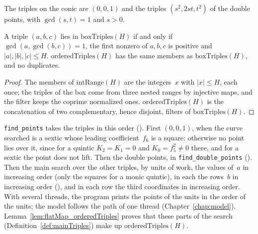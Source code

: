 The triples on the conic are $(0, 0, 1)$ and the triples $(s^2, 2st, t^2)$ of the double points,
with $\gcd(s, t) = 1$ and $s > 0$.

\begin{lemma}\label{lem:mem_orderedTriples_iff}
  \leanok
  A triple $(a, b, c)$ lies in $\mathrm{boxTriples}(H)$ if and only if $\gcd(a, \gcd(b, c)) = 1$, the first
  nonzero of $a, b, c$ is positive and $|a|, |b|, |c| \le H$. $\mathrm{orderedTriples}(H)$ has the
  same members as $\mathrm{boxTriples}(H)$, and no duplicates.
\end{lemma}

\begin{proof}\leanok
  The members of $\mathrm{intRange}(H)$ are the integers~$x$ with $|x| \le H$, each once; the
  triples of the box come from three nested ranges by injective maps, and the filter keeps the
  coprime normalized ones. $\mathrm{orderedTriples}(H)$ is the concatenation of two complementary,
  hence disjoint, filters of $\mathrm{boxTriples}(H)$.
\end{proof}

\begin{remark}\label{rem:specTriplesC}
  \texttt{find\_points} takes the triples in this order (). First
  $(0, 0, 1)$, when the curve searched is a sextic whose leading coefficient~$f_6$ is a square:
  otherwise no point lies over it, since for a quintic $K_2 = K_1 = 0$ and $K_0 = f_5^2 \ne 0$
  there, and for a sextic the point does not lift. Then the double points, in
  \texttt{find\_double\_points} (). Then the main search over the
  other triples, by units of work, the values of~$a$ in increasing order (only the squares for a
  monic quintic), in each the rows~$b$ in increasing order (), and
  in each row the third coordinates in increasing order. With several threads, the program prints
  the points of the units in the order of the units; the model follows the path of one thread
  (Chapter~\ref{chap:model}). Lemma~\ref{lem:flatMap_orderedTriples} proves that these parts of
  the search (Definition~\ref{def:mainTriples}) make up $\mathrm{orderedTriples}(H)$.
\end{remark}

